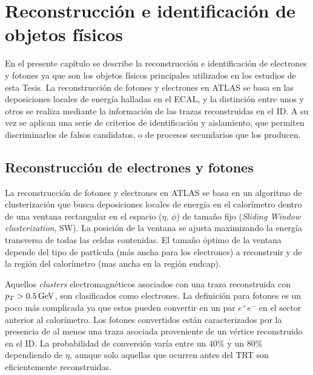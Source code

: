 \chapter{Reconstrucción e identificación de objetos físicos}


En el presente capítulo se describe la reconstrucción e identificación de electrones y fotones ya que son los objetos físicos principales utilizados en los estudios de esta Tesis. La reconstrucción de fotones y electrones en ATLAS se basa en las deposiciones locales de energía halladas en el ECAL, y la distinción entre unos y otros se   realiza mediante la información de las trazas reconstruidas en el ID. A su vez se aplican una serie de criterios de identificación y aislamiento, que permiten discriminarlos de falsos candidatos, o de procesos secundarios que los producen.

\section{Reconstrucción de electrones y fotones}

La  reconstrucción de fotones y electrones en ATLAS se basa en un algoritmo de clusterización \cite{Lampl:1099735} que busca deposiciones locales de energía en el calorímetro dentro de una ventana rectangular en el espacio ($\eta$, $\phi$) de tamaño fijo (\textit{Sliding Window clusterization}, SW). La posición de la ventana se ajusta maximizando la energía transversa de todas las celdas contenidas. El tamaño óptimo de la ventana depende del tipo de partícula (más ancha para los electrones) a reconstruir y de la región del calorímetro (mas ancha en la región endcap). 

Aquellos \textit{clusters} electromagnéticos asociados con una traza reconstruida con $p_{T} > 0.5 \, \mathrm{GeV}$, son clasificados como electrones. La definición para fotones es un poco más complicada ya que estos pueden convertir en un par $e^{+}e^{-}$ en el sector anterior al calorímetro. Los fotones convertidos están caracterizados por la presencia de al menos una traza asociada proveniente de un vértice reconstruido en el ID. La probabilidad de conversión varía entre un 40\% y un 80\% dependiendo de $\eta$, aunque solo aquellas que ocurren antes del TRT son eficientemente reconstruidas. 

